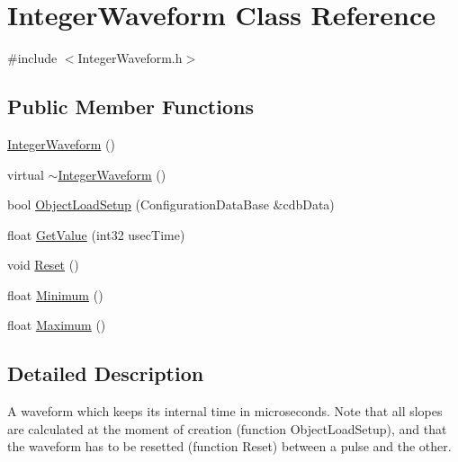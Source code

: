\hypertarget{classIntegerWaveform}{
\section{IntegerWaveform Class Reference}
\label{classIntegerWaveform}
}


{\ttfamily \#include $<$IntegerWaveform.h$>$}

\subsection*{Public Member Functions}
\begin{DoxyCompactItemize}
\item 
\hyperlink{classIntegerWaveform_ac3b34133ae90c80c9ae32051cec2611a}{IntegerWaveform} ()
\item 
virtual \hyperlink{classIntegerWaveform_a929899dea90a14cc1ea676df7336d090}{$\sim$IntegerWaveform} ()
\item 
bool \hyperlink{classIntegerWaveform_afb9674852c2d2040508a375c1c5cc8d6}{ObjectLoadSetup} (ConfigurationDataBase \&cdbData)
\item 
float \hyperlink{classIntegerWaveform_ab236b723a92b8f174c65930671887ae6}{GetValue} (int32 usecTime)
\item 
void \hyperlink{classIntegerWaveform_a15587809f76da953aaaf03264298cf5e}{Reset} ()
\item 
float \hyperlink{classIntegerWaveform_ad6582c22eb5896be14805487706711d0}{Minimum} ()
\item 
float \hyperlink{classIntegerWaveform_ad669c89fd753d72f6aca58af1dde2b78}{Maximum} ()
\end{DoxyCompactItemize}


\subsection{Detailed Description}
A waveform which keeps its internal time in microseconds. Note that all slopes are calculated at the moment of creation (function ObjectLoadSetup), and that the waveform has to be resetted (function Reset) between a pulse and the other. 


